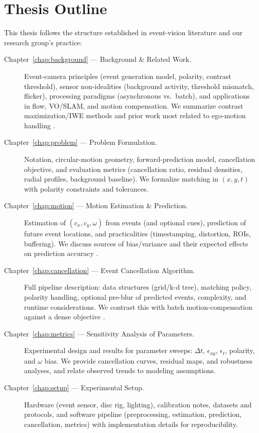 \section{Thesis Outline}
\label{sec:outline}

This thesis follows the structure established in event-vision literature and our research group’s practice:

\begin{description}
    \item[Chapter~\ref{chap:background} --- Background \& Related Work.] Event-camera principles (event generation model, polarity, contrast threshold), sensor non-idealities (background activity, threshold mismatch, flicker), processing paradigms (asynchronous vs.\ batch), and applications in flow, VO/SLAM, and motion compensation. We summarize contrast maximization/IWE methods and prior work most related to ego-motion handling \cite{Gallego2020Survey,Bardow2016SOFIE,Gallego2018CMax}.
    \item[Chapter~\ref{chap:problem} --- Problem Formulation.] Notation, circular-motion geometry, forward-prediction model, cancellation objective, and evaluation metrics (cancellation ratio, residual densities, radial profiles, background baseline). We formalize matching in $(x,y,t)$ with polarity constraints and tolerances.
    \item[Chapter~\ref{chap:motion} --- Motion Estimation \& Prediction.] Estimation of $(c_x,c_y,\omega)$ from events (and optional cues), prediction of future event locations, and practicalities (timestamping, distortion, ROIs, buffering). We discuss sources of bias/variance and their expected effects on prediction accuracy \cite{Gallego2017Angular}.
    \item[Chapter~\ref{chap:cancellation} --- Event Cancellation Algorithm.] Full pipeline description: data structures (grid/k-d tree), matching policy, polarity handling, optional pre-blur of predicted events, complexity, and runtime considerations. We contrast this with batch motion-compensation against a dense objective \cite{Gallego2018CMax}.
    \item[Chapter~\ref{chap:metrics} --- Sensitivity Analysis of Parameters.] Experimental design and results for parameter sweeps: $\Delta t$, $\epsilon_{xy}$, $\epsilon_t$, polarity, and $\omega$ bias. We provide cancellation curves, residual maps, and robustness analyses, and relate observed trends to modeling assumptions.
    \item[Chapter~\ref{chap:setup} --- Experimental Setup.] Hardware (event sensor, disc rig, lighting), calibration notes, datasets and protocols, and software pipeline (preprocessing, estimation, prediction, cancellation, metrics) with implementation details for reproducibility.

\end{description}
